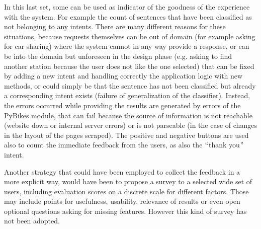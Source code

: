In this last set, some can be used as indicator of the goodness of the experience with the system. For example the count of sentences that have been classified as not belonging to any intents. There are many different reasons for these situations, because requests themselves can be out of domain (for example asking for car sharing) where the system cannot in any way provide a response, or can be into the domain but unforeseen in the design phase (e.g. asking to find another station because the user does not like the one selected) that can be fixed by adding a new intent and handling correctly the application logic with new methods, or could simply be that the sentence has not been classified but already a corresponding intent exists (failure of generalization of the classifier). Instead, the errors occurred while providing the results are generated by errors of the PyBikes module, that can fail because the source of information is not reachable (website down or internal server errors) or is not parseable (in the case of changes in the layout of the pages scraped). The positive and negative buttons are used also to count the immediate feedback from the users, as also the $``$thank you$"$  intent.

Another strategy that could have been employed to collect the feedback in a more explicit way, would have been to propose a survey to a selected wide set of users, including evaluation scores on a discrete scale for different factors. Those may include points for usefulness, usability, relevance of results or even open optional questions asking for missing features. However this kind of survey has not been adopted.
